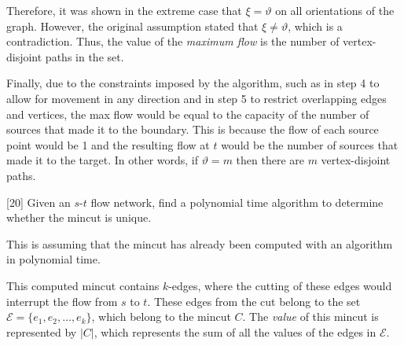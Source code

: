 \documentclass[addpoints]{exam}
\begin{document}
\begin{questions}
\begin{solution}
\begin{enumerate}
\begin{center}
\end{center}
\end{enumerate}

Therefore, it was shown in the extreme case that $\xi = \vartheta$ on all orientations of the graph. However, the original assumption stated that $\xi \neq \vartheta$, which is a contradiction. Thus, the value of the {\em maximum flow} is the number of vertex-disjoint paths in the set.

Finally, due to the constraints imposed by the algorithm, such as in step 4 to allow for movement in any direction and in step 5 to restrict overlapping edges and vertices, the max flow would be equal to the capacity of the number of sources that made it to the boundary. This is because the flow of each source point would be 1 and the resulting flow at $t$ would be the number of sources that made it to the target. In other words, if $\vartheta = m$ then there are $m$ vertex-disjoint paths.

\end{solution}

[20]
Given an $s$-$t$ flow network, find a polynomial time algorithm to
determine whether the mincut is unique.

\begin{solution}
This is assuming that the mincut has already been computed with an algorithm in polynomial time. 

This computed mincut contains $k$-edges, where the cutting of these edges would interrupt the flow from $s$ to $t$. These edges from the cut belong to the set $\mathcal{E}=\{e_{1},e_{2},\ldots,e_{k}\}$, which belong to the mincut $C$. The {\em value} of this mincut is represented by $\left| C\right|$, which represents the sum of all the values of the edges in $\mathcal{E}$.


\end{solution}
\end{questions}
\end{document}
